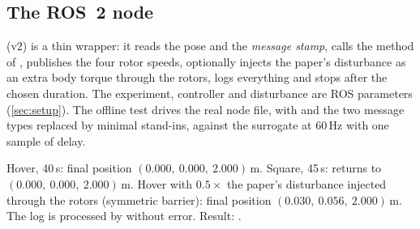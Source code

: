 \subsection{The ROS~2 node}

 (v2) is a thin wrapper: it reads the pose and the \emph{message stamp}, calls the
 method of , publishes the four rotor speeds, optionally injects the paper's disturbance as an extra
body torque through the rotors, logs everything and stops after the chosen duration. The experiment, controller and
disturbance are ROS parameters (\cref{sec:setup}). The offline test drives the real node file, with  and the
two message types replaced by minimal stand-ins, against the surrogate at 60\,Hz with one sample of delay.

\begin{projbox}
Hover, 40\,s: final position $(0.000,\ 0.000,\ 2.000)$\,m. Square, 45\,s: returns to $(0.000,\ 0.000,\ 2.000)$\,m. Hover with
$0.5\times$ the paper's disturbance injected through the rotors (symmetric barrier): final position $(0.030,\ 0.056,\ 2.000)$\,m.
The log is processed by  without error. Result: .
\end{projbox}
